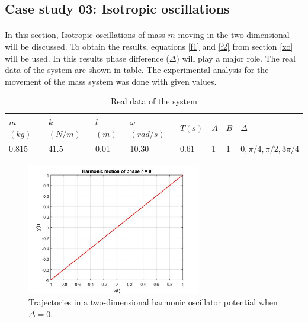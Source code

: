 \subsection{Case study 03: Isotropic oscillations 
}
\paragraph{}

In this section, Isotropic oscillations of mass $m$ moving in the two-dimensional will be discussed. To obtain the results, equations \eqref{f1} and \eqref{f2} from section \ref{xo} will be used. In this results phase difference ($\Delta$) will play a major role. The real data of the system are shown in table.  The experimental analysis for the movement of the mass system was done with given values.  

\begin{table}[h]
\begin{center}

\begin{tabular}{@{}|l|l|l|l|l|l|l|l|@{}}
\toprule
 $m$ $(kg)$  & $k$ $(N/m)$ & $l$ $(m)$ & $\omega$ $(rad/s)$& $T (s)$ & $A$ & $B$  & $\Delta$ \\
\midrule \hline
 0.815    & 41.5  & 0.01 & 10.30 & 0.61&  1 &  1& $ 0, \pi/4, \pi/2, 3\pi/4  $  \\ 
\hline
\end{tabular}
\caption{Real data of the system \cite{JETIRRes28:online,levitan1960forced}}
\label{phase1}%
\end{center}
\end{table}

\newpage


 \begin{figure}[hbt!]
	\centering
	\begin{framed}
	\includegraphics[width=0.68\textwidth]{Figures/0.jpg}
	\end{framed}
	\caption{ Trajectories in a two-dimensional harmonic oscillator potential when $\Delta = 0$. }
	\label{fig:O1}
\end{figure}

